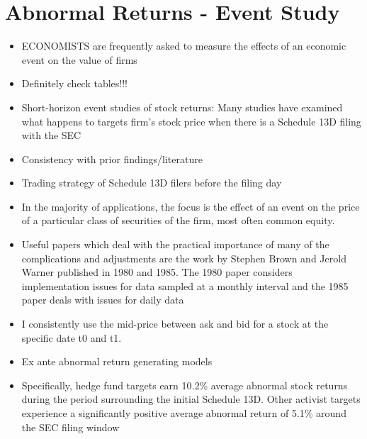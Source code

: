 \documentclass[12pt]{article}
\begin{document}
\section{Abnormal Returns - Event Study} 


    \begin{itemize}
        
        \item ECONOMISTS are frequently asked to measure the effects of an economic event on the value of firms \citep{MacKinlay1997}

        \item Definitely check \citet{Betton2009} tables!!! 

        \item Short-horizon event studies of stock returns: Many studies have examined what happens to targets firm’s stock price when there is a Schedule 13D filing with the SEC \citep{CoffeeJr.2014}

        \item Consistency with prior findings/literature

        \item Trading strategy of Schedule 13D filers before the filing day \citep{Collin-Dufresne2015}
        
        \item In the majority of applications, the focus is the effect of an event on the price of a particular class of securities of the firm, most often common equity. \citep{MacKinlay1997}

        \item Useful papers which deal with the practical importance of many of the complications and adjustments are the work by Stephen Brown and Jerold Warner published in 1980 and 1985. The 1980 paper considers implementation issues for data sampled at a monthly interval and the 1985 paper deals with issues for daily data \citep{MacKinlay1997}

        \item I consistently use the mid-price between ask and bid for a stock at the specific date t0 and t1. \citep{Mohr2012}

        \item Ex ante abnormal return generating models \citep{Kolari2010}

        \item Specifically, hedge fund targets earn 10.2\% average abnormal stock returns during the period surrounding the initial Schedule 13D. Other activist targets experience a significantly positive average abnormal return of 5.1\% around the SEC filing window \citep{Klein2009}


\end{itemize}
\end{document}
